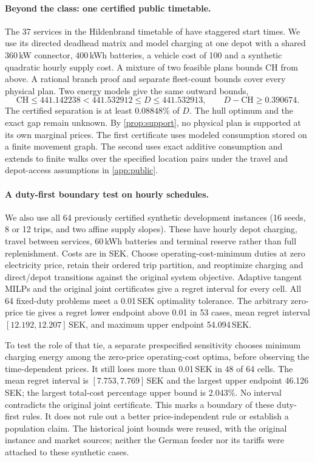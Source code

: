 \documentclass[11pt]{article}
\theoremstyle{definition}\newtheorem{definition}[theorem]{Definition}
\theoremstyle{remark}\newtheorem{remark}[theorem]{Remark}
\newcommand{\CH}{\mathrm{CH}}
\begin{document}
\paragraph{Beyond the class: one certified public timetable.}
The 37 services in the Hildenbrand timetable of \citet{sistig2025dataset} have
staggered start times. We use its directed deadhead matrix and model charging at
one depot with a shared 360\,kW connector, 400\,kWh batteries, a vehicle cost of
100 and a synthetic quadratic hourly supply cost. A mixture of two feasible
plans bounds $\CH$ from above. A rational branch proof and separate fleet-count
bounds cover every physical plan. Two energy models give the same outward bounds,
\[
 \CH\le 441.142238<441.532912\le D\le 441.532913,
 \qquad D-\CH\ge 0.390674.
\]
The certified separation is at least $0.08848\%$ of $D$. The hull optimum and
the exact gap remain unknown. By \cref{prop:support}, no physical plan is
supported at its own marginal prices. The first certificate uses modeled
consumption stored on a finite movement graph. The second uses exact additive
consumption and extends to finite walks over the specified location pairs
under the travel and depot-access assumptions in \cref{app:public}.

\paragraph{A duty-first boundary test on hourly schedules.}
We also use all 64 previously certified synthetic development instances
(16 seeds, 8 or 12 trips, and two affine supply slopes). These have
hourly depot charging, travel between services, 60\,kWh batteries and
terminal reserve rather than full replenishment. Costs are in SEK.
Choose operating-cost-minimum duties at zero electricity price, retain
their ordered trip partition, and reoptimize charging and direct/depot
transitions against the original system objective. Adaptive tangent MILPs
and the original joint certificates give a regret interval for every cell.
All 64 fixed-duty problems meet a 0.01\,SEK optimality tolerance. The
arbitrary zero-price tie gives a regret lower endpoint above 0.01 in
53 cases, mean regret interval $[12.192,12.207]$\,SEK, and maximum upper
endpoint 54.094\,SEK.

To test the role of that tie, a separate prespecified sensitivity chooses
minimum charging energy among the zero-price operating-cost optima, before
observing the time-dependent prices. It still loses more than 0.01\,SEK
in 48 of 64 cells. The mean regret interval is $[7.753,7.769]$\,SEK and
the largest upper endpoint 46.126\,SEK; the largest total-cost percentage
upper bound is 2.043\%. No interval contradicts the original joint
certificate. This marks a boundary of these duty-first rules. It does not
rule out a better price-independent rule or establish a population claim.
The historical joint bounds were reused, with the original instance and
market sources; neither the German feeder nor its tariffs were attached to
these synthetic cases.
\end{document}

